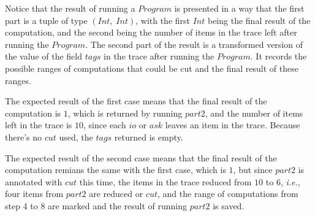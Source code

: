 \documentclass[10pt]{article}
\begin{document}
Notice that the result of running a $Program$ is presented in a way that the first part is a tuple of type $(Int,\; Int)$, with the first $Int$ being the final result of the computation, and the second being the number of items in the trace left after running the $Program$. The second part of the result is a transformed version of the value of the field $tags$ in the trace after running the $Program$. It records the possible ranges of computations that could be cut and the final result of these ranges.

The expected result of the first case means that the final result of the computation is $1$, which is returned by running $part2$, and the number of items left in the trace is $10$, since each $io$ or $ask$ leaves an item in the trace. Because there's no $cut$ used, the $tags$ returned is empty.

The expected result of the second case means that the final result of the computation remians the same with the first case, which is $1$, but since $part2$ is annotated with $cut$ this time, the items in the trace reduced from $10$ to $6$, \textit{i.e.}, four items from $part2$ are reduced or $cut$, and the range of computations from step 4 to 8 are marked and the result of running $part2$ is saved.
\end{document}
